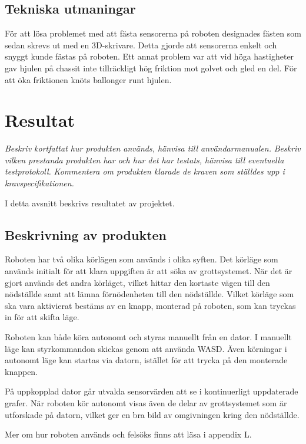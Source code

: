 \documentclass[11pt]{article}
\begin{document}
\begin{flushleft}
\subsection{Tekniska utmaningar}
För att lösa problemet med att fästa sensorerna på roboten designades fästen som sedan skrevs ut med en 3D-skrivare. Detta gjorde att sensorerna enkelt och snyggt kunde fästas på roboten. Ett annat problem var att vid höga hastigheter gav hjulen på chassit inte tillräckligt hög friktion mot golvet och gled en del. För att öka friktionen knöts ballonger runt hjulen.

\pagebreak

\section{Resultat}
\textit{Beskriv kortfattat hur produkten används, hänvisa till användarmanualen.}
\textit{Beskriv vilken prestanda produkten har och hur det har testats, hänvisa till eventuella testprotokoll.}
\textit{Kommentera om produkten klarade de kraven som ställdes upp i kravspecifikationen. }

I detta avsnitt beskrivs resultatet av projektet.
\subsection{Beskrivning av produkten}
Roboten har två olika körlägen som används i olika syften. Det körläge som används initialt för att klara uppgiften är att söka av grottsystemet. När det är gjort används det andra körläget, vilket hittar den kortaste vägen till den nödställde samt att lämna förnödenheten till den nödställde. Vilket körläge som ska vara aktivierat bestäms av en knapp, monterad på roboten, som kan tryckas in för att skifta läge. 


Roboten kan både köra autonomt och styras manuellt från en dator. I manuellt läge kan styrkommandon skickas genom att använda WASD. Även körningar i autonomt läge kan startas via datorn, istället för att trycka på den monterade knappen. 

På uppkopplad dator går utvalda sensorvärden att se i kontinuerligt uppdaterade grafer. När roboten kör autonomt visas även de delar av grottsystemet som är utforskade på datorn, vilket ger en bra bild av omgivningen kring den nödställde.

Mer om hur roboten används och felsöks finns att läsa i appendix L.


\end{flushleft}
\end{document}
